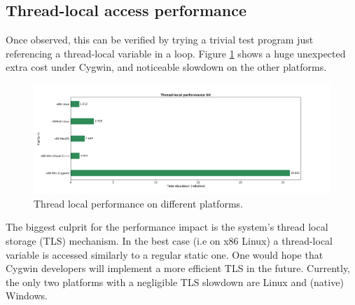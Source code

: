 \subsection{Thread-local access performance}

Once observed, this can be verified by trying a trivial test program just referencing a
thread-local variable in a loop. Figure \ref{fig:threadlocal}
shows a huge unexpected extra cost under Cygwin, and noticeable slowdown on the other platforms.

\begin{figure}[H]
\centering
\includegraphics[width=1\linewidth]{thread_local.png}
\caption{Thread local performance on different platforms.}
\label{fig:threadlocal}
\end{figure}

The biggest culprit for the performance impact is the system's thread local storage (TLS)
mechanism. In the best case (i.e on x86 Linux) a thread-local variable is accessed
similarly to a regular static one. One would hope that Cygwin developers will
implement a more efficient TLS in the future. Currently, the only two platforms
with a negligible TLS slowdown are Linux and (native) Windows.